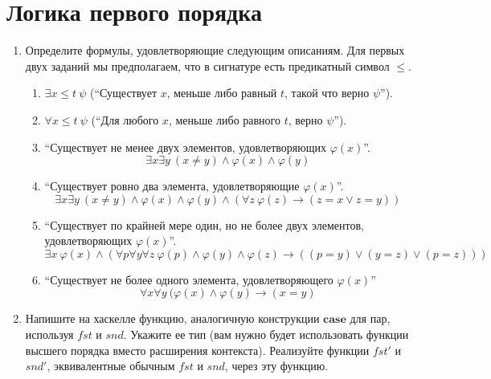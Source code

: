 \section*{Логика первого порядка}

\begin{enumerate}

\item Определите формулы, удовлетворяющие следующим описаниям.
    Для первых двух заданий мы предполагаем, что в сигнатуре есть предикатный символ $\leq$.
\begin{enumerate}
\item $\exists x \leq t\ \psi$ (``Существует $x$, меньше либо равный $t$, такой что верно $\psi$'').
\item $\forall x \leq t\ \psi$ (``Для любого $x$, меньше либо равного $t$, верно $\psi$'').
\item ``Существует не менее двух элементов, удовлетворяющих $\varphi(x)$''.
\begin{equation*}
\exists x \exists y \ (x \neq y) \land \varphi(x) \land \varphi(y)
\end{equation*}
\item ``Существует ровно два элемента, удовлетворяющие $\varphi(x)$''.
\begin{equation*}
	\exists x \exists y \ (x \neq y) \land \varphi(x) \land \varphi(y) \land (\forall z \ \varphi(z) \to (z = x \lor z = y))
\end{equation*}
\item ``Существует по крайней мере один, но не более двух элементов, удовлетворяющих $\varphi(x)$''.
\begin{equation*}
	\exists x \ \varphi(x) \land (\forall p \forall y \forall z \ \varphi(p) \land \varphi(y) \land \varphi(z) \to ((p = y) \lor (y = z) \lor (p = z)))
\end{equation*}

\item ``Существует не более одного элемента, удовлетворяющего $\varphi(x)$''
\begin{equation*}
	\forall x \forall y \ (\varphi(x) \land \varphi(y) \to (x = y)
\end{equation*}
\end{enumerate}

\item Напишите на хаскелле функцию, аналогичную конструкции $\mathbf{case}$ для пар, используя $fst$ и $snd$.
    Укажите ее тип (вам нужно будет использовать функции высшего порядка вместо расширения контекста).
    Реализуйте функции $fst'$ и $snd'$, эквивалентные обычным $fst$ и $snd$, через эту функцию.


\end{enumerate}
